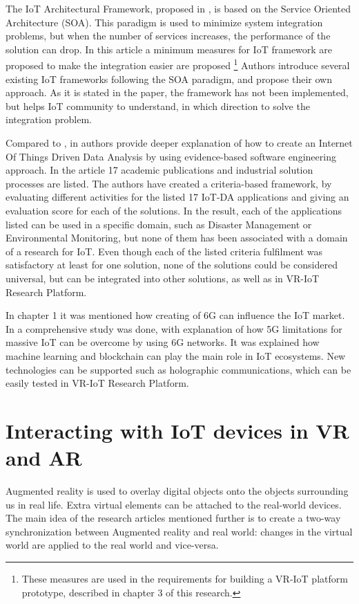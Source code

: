 The IoT Architectural Framework, proposed in \cite{uviase_iot_2018}, is based on the Service Oriented Architecture (SOA). This paradigm is used to minimize system integration problems, but when the number of services increases, the performance of the solution can drop. In this article a minimum measures for IoT framework are proposed to make the integration easier are proposed \footnote{These measures are used in the requirements for building a VR-IoT platform prototype, described in chapter 3 of this research.} Authors introduce several existing IoT frameworks following the SOA paradigm, and propose their own approach. As it is stated in the paper, the framework has not been implemented, but helps IoT community to understand, in which direction to solve the integration problem.

Compared to \cite{k_mohapatra_solution_2016}, in \cite{ahmad_software_2021} authors provide deeper explanation of how to create an Internet Of Things Driven Data Analysis by using evidence-based software engineering approach. In the article 17 academic publications and industrial solution processes are listed. The authors have created a criteria-based framework, by evaluating different activities for the listed 17 IoT-DA applications and giving an evaluation score for each of the solutions. In the result, each of the applications listed can be used in a specific domain, such as Disaster Management or Environmental Monitoring, but none of them has been associated with a domain of a research for IoT. Even though each of the listed criteria fulfilment was satisfactory at least for one solution, none of the solutions could be considered universal, but can be integrated into other solutions, as well as in VR-IoT Research Platform.

In chapter 1 it was mentioned how creating of 6G can influence the IoT market. In \cite{guo_enabling_2021} a comprehensive study was done, with explanation of how 5G limitations for massive IoT can be overcome by using 6G networks. It was explained how machine learning and blockchain can play the main role in IoT ecosystems. New technologies can be supported such as holographic communications, which can be easily tested in VR-IoT Research Platform.

\section{Interacting with IoT devices in VR and AR}

Augmented reality is used to overlay digital objects onto the objects surrounding us in real life. Extra virtual elements can be attached to the real-world devices. The main idea of the research articles mentioned further is to create a two-way synchronization between Augmented reality and real world: changes in the virtual world are applied to the real world and vice-versa.

